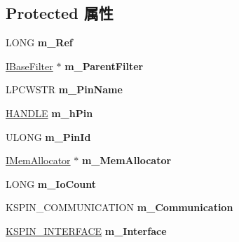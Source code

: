 \subsection*{Protected 属性}
\begin{DoxyCompactItemize}
\item 
\mbox{\label{class_c_input_pin_adc51b4e9854bd174ee6dfefc942c5067}} 
L\+O\+NG {\bfseries m\+\_\+\+Ref}
\item 
\mbox{\label{class_c_input_pin_ac273d0b6302889464cc3cb4130d8f6bc}} 
\hyperlink{interface_i_base_filter}{I\+Base\+Filter} $\ast$ {\bfseries m\+\_\+\+Parent\+Filter}
\item 
\mbox{\label{class_c_input_pin_a963ce610e79ce12f08e374d3275ca0b7}} 
L\+P\+C\+W\+S\+TR {\bfseries m\+\_\+\+Pin\+Name}
\item 
\mbox{\label{class_c_input_pin_ad57fb5aafa399be4c8178a73843dc2d8}} 
\hyperlink{interfacevoid}{H\+A\+N\+D\+LE} {\bfseries m\+\_\+h\+Pin}
\item 
\mbox{\label{class_c_input_pin_a1e4ef08b360cd8a90ced9bbe756d30a6}} 
U\+L\+O\+NG {\bfseries m\+\_\+\+Pin\+Id}
\item 
\mbox{\label{class_c_input_pin_ab7012d365373937cf5b57c365bd4badd}} 
\hyperlink{interface_i_mem_allocator}{I\+Mem\+Allocator} $\ast$ {\bfseries m\+\_\+\+Mem\+Allocator}
\item 
\mbox{\label{class_c_input_pin_a841f09f27ae633a66babea4f5e9273e7}} 
L\+O\+NG {\bfseries m\+\_\+\+Io\+Count}
\item 
\mbox{\label{class_c_input_pin_ac26830d18da68cefc2d1bbc2a86f6ced}} 
K\+S\+P\+I\+N\+\_\+\+C\+O\+M\+M\+U\+N\+I\+C\+A\+T\+I\+ON {\bfseries m\+\_\+\+Communication}
\item 
\mbox{\label{class_c_input_pin_a6699cb1c7bc09e3750b308b161933b48}} 
\hyperlink{struct_k_s_i_d_e_n_t_i_f_i_e_r}{K\+S\+P\+I\+N\+\_\+\+I\+N\+T\+E\+R\+F\+A\+CE} {\bfseries m\+\_\+\+Interface}
\item 
\mbox{\label{class_c_input_pin_af0528a1cc94c6cabce4b736ebd9d8bc6}} 

\end{DoxyCompactItemize}
